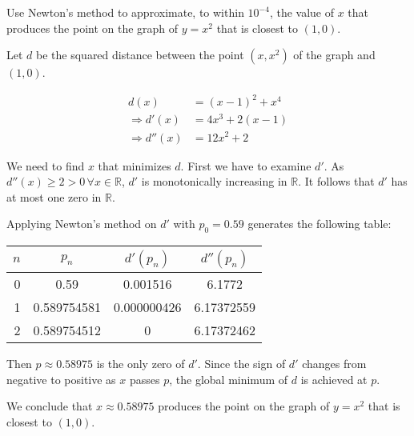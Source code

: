 \documentclass[../../../../Assignments]{subfiles}
\begin{document}
\begin{exercise}
    Use Newton's method to approximate, to within \(10^{-4}\), the value of
    \(x\) that produces the point on the graph of \(y = x^2\) that is closest to
    \((1, 0)\).
\end{exercise}

\begin{solution}
    Let \(d\) be the squared distance between the point \((x, x^2)\) of the
    graph and \((1, 0)\).

    \begin{align*}
                      d(x) &= (x - 1)^2 + x^4 \\
        \Rightarrow  d'(x) &= 4x^3 + 2(x - 1) \\
        \Rightarrow d''(x) &= 12x^2 + 2
    \end{align*}

    We need to find \(x\) that minimizes \(d\). First we have to examine \(d'\).
    As \(d''(x) \geq 2 > 0 \, \forall x \in \mathbb{R}\), \(d'\) is
    monotonically increasing in \(\mathbb{R}\). It follows that \(d'\) has at
    most one zero in \(\mathbb{R}\).

    Applying Newton's method on \(d'\) with \(p_0 = 0.59\) generates the
    following table:

    \begin{table}[H]
        \centering
        \begin{tabular}{r S[table-format=1.9] S[table-format=1.9] S[table-format=1.8]}
            \toprule
            \(n\)  &   {\(p_n\)}   &  {\(d'(p_n)\)}  &  {\(d''(p_n)\)}  \\
              &  0.59         &  0.001516       &  6.1772          \\
                1  &  0.589754581  &  0.000000426    &  6.17372559      \\
                2  &  0.589754512  &  0              &  6.17372462      \\
            \bottomrule
        \end{tabular}
    \end{table}

    Then \(p \approx \num{0.58975}\) is the only zero of \(d'\). Since the sign
    of \(d'\) changes from negative to positive as \(x\) passes \(p\), the
    global minimum of \(d\) is achieved at \(p\).

    We conclude that \(x \approx \num{0.58975}\) produces the point on the graph
    of \(y = x^2\) that is closest to \((1, 0)\).
\end{solution}
\end{document}
